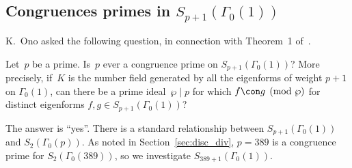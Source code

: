 \documentclass{report}
\begin{document}

\subsection{Congruences primes in $S_{p+1}(\Gamma_0(1))$}
K.~Ono asked the following question, in connection with
Theorem~1 of~\cite{gordon-ono:vis}.
\begin{question}
Let~$p$ be a prime.  Is~$p$ ever a congruence prime on $S_{p+1}(\Gamma_0(1))$?
More precisely, if~$K$ is the number field generated by all the
eigenforms of weight $p+1$ on $\Gamma_0(1)$, can there be a prime
ideal~$\wp\mid p$ for which
$
f \con g \pmod{\wp}
$
for distinct eigenforms $f, g \in S_{p+1}(\Gamma_0(1))$?
\end{question}

The answer is ``yes''.
There is a standard relationship between
$S_{p+1}(\Gamma_0(1))$ and $S_2(\Gamma_0(p))$.  As noted
in Section~\ref{sec:disc_div},  $p=389$ is a
congruence prime for $S_2(\Gamma_0(389))$, so we investigate
$S_{389+1}(\Gamma_0(1))$.
\end{document}
